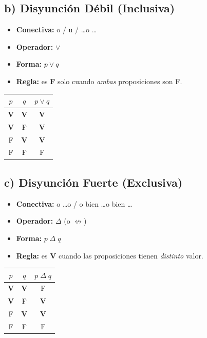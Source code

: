 \documentclass[12pt,a4paper]{article}
\newcommand{\TV}[1]{\textbf{#1}}   %
\begin{document}
\bigskip

\subsection{b) Disyunción Débil (Inclusiva)}

\begin{minipage}{0.55\linewidth}
\begin{itemize}[leftmargin=*]
  \item \textbf{Conectiva:} o / u / \ldots o \ldots
  \item \textbf{Operador:} $\vee$
  \item \textbf{Forma:} $p \vee q$
  \item \textbf{Regla:} es \textbf{F} solo cuando \emph{ambas} proposiciones son F.
\end{itemize}
\end{minipage}%
\hfill
\begin{minipage}{0.38\linewidth}
\centering
\begin{tabular}{cc|c}
\toprule
$p$ & $q$ & $p \vee q$ \\
\midrule
\TV{V} & \TV{V} & \TV{V} \\
\TV{V} & F      & \TV{V} \\
F      & \TV{V} & \TV{V} \\
F      & F      & F      \\
\bottomrule
\end{tabular}
\end{minipage}

\bigskip

\subsection{c) Disyunción Fuerte (Exclusiva)}

\begin{minipage}{0.55\linewidth}
\begin{itemize}[leftmargin=*]
  \item \textbf{Conectiva:} o \ldots o / o bien \ldots o bien \ldots
  \item \textbf{Operador:} $\Delta$ (o $\not\leftrightarrow$)
  \item \textbf{Forma:} $p \;\Delta\; q$
  \item \textbf{Regla:} es \textbf{V} cuando las proposiciones tienen \emph{distinto} valor.
\end{itemize}
\end{minipage}%
\hfill
\begin{minipage}{0.38\linewidth}
\centering
\begin{tabular}{cc|c}
\toprule
$p$ & $q$ & $p \;\Delta\; q$ \\
\midrule
\TV{V} & \TV{V} & F      \\
\TV{V} & F      & \TV{V} \\
F      & \TV{V} & \TV{V} \\
F      & F      & F      \\
\bottomrule
\end{tabular}
\end{minipage}
\end{document}
